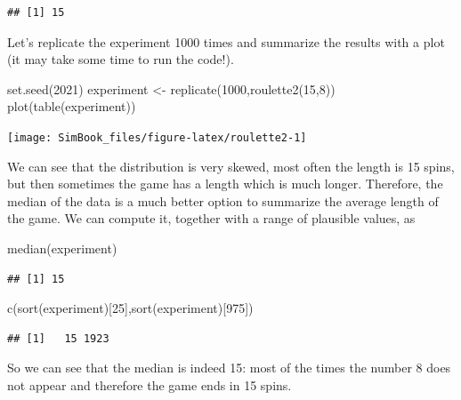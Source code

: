 \documentclass[
]{book}
\newenvironment{Shaded}{\begin{snugshade}}{\end{snugshade}}
\newcommand{\DecValTok}[1]{\textcolor[rgb]{0.00,0.00,0.81}{#1}}
\newcommand{\FunctionTok}[1]{\textcolor[rgb]{0.00,0.00,0.00}{#1}}
\newcommand{\NormalTok}[1]{#1}
\newcommand{\OtherTok}[1]{\textcolor[rgb]{0.56,0.35,0.01}{#1}}
\begin{document}
\begin{verbatim}
## [1] 15
\end{verbatim}

Let's replicate the experiment 1000 times and summarize the results with a plot (it may take some time to run the code!).

\begin{Shaded}
\begin{Highlighting}[]
\FunctionTok{set.seed}\NormalTok{(}\DecValTok{2021}\NormalTok{)}
\NormalTok{experiment }\OtherTok{\textless{}{-}} \FunctionTok{replicate}\NormalTok{(}\DecValTok{1000}\NormalTok{,}\FunctionTok{roulette2}\NormalTok{(}\DecValTok{15}\NormalTok{,}\DecValTok{8}\NormalTok{))}
\FunctionTok{plot}\NormalTok{(}\FunctionTok{table}\NormalTok{(experiment))}
\end{Highlighting}
\end{Shaded}

\begin{center}\texttt{[image: SimBook\_files/figure-latex/roulette2-1]} \end{center}

We can see that the distribution is very skewed, most often the length is 15 spins, but then sometimes the game has a length which is much longer. Therefore, the median of the data is a much better option to summarize the average length of the game. We can compute it, together with a range of plausible values, as

\begin{Shaded}
\begin{Highlighting}[]
\FunctionTok{median}\NormalTok{(experiment)}
\end{Highlighting}
\end{Shaded}

\begin{verbatim}
## [1] 15
\end{verbatim}

\begin{Shaded}
\begin{Highlighting}[]
\FunctionTok{c}\NormalTok{(}\FunctionTok{sort}\NormalTok{(experiment)[}\DecValTok{25}\NormalTok{],}\FunctionTok{sort}\NormalTok{(experiment)[}\DecValTok{975}\NormalTok{])}
\end{Highlighting}
\end{Shaded}

\begin{verbatim}
## [1]   15 1923
\end{verbatim}

So we can see that the median is indeed 15: most of the times the number 8 does not appear and therefore the game ends in 15 spins.
\end{document}
